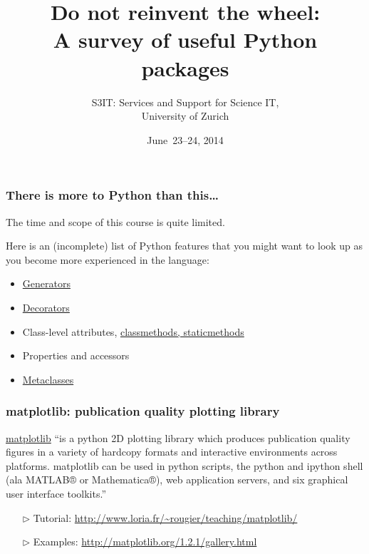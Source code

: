 \documentclass[english,serif,mathserif,xcolor=pdftex,dvipsnames,table]{beamer}
\title[Introduction]{%
  Do not reinvent the wheel:
  \\
  A survey of useful Python packages
}
\author[S3IT]{%
  S3IT: Services and Support for Science IT, \\
  University of Zurich
}
\date{June~23--24, 2014}
\begin{document}
\maketitle

\begin{frame}
  \frametitle{There is more to Python than this\ldots}

  The time and scope of this course is quite limited.

  \+
  Here is an (incomplete) list of Python features that you might
  want to look up as you become more experienced in the language:
  \begin{itemize}
  \item
    \href{http://docs.python.org/2/tutorial/classes.html\#generators}{Generators}
  \item \href{http://www.artima.com/weblogs/viewpost.jsp?thread=240808}{Decorators}
  \item Class-level attributes, \href{http://stackoverflow.com/a/12179752/1808780}{classmethods, staticmethods}
  \item Properties and accessors
  \item \href{http://stackoverflow.com/a/6581949/459543}{Metaclasses}
  \end{itemize}
\end{frame}


\begin{frame}[fragile]
  \frametitle{matplotlib: publication quality plotting library}

  \href{http://matplotlib.org/}{matplotlib} ``is a python 2D plotting
  library which produces publication quality figures in a variety of
  hardcopy formats and interactive environments across
  platforms. matplotlib can be used in python scripts, the python and
  ipython shell (ala MATLAB® or Mathematica®), web application
  servers, and six graphical user interface toolkits.''

  \+
  \begin{itemize}
  \item[$\triangleright$] Tutorial: {\footnotesize\url{http://www.loria.fr/~rougier/teaching/matplotlib/}}
  \item[$\triangleright$] Examples: {\footnotesize\url{http://matplotlib.org/1.2.1/gallery.html}}
  \end{itemize}
\end{frame}
\end{document}
